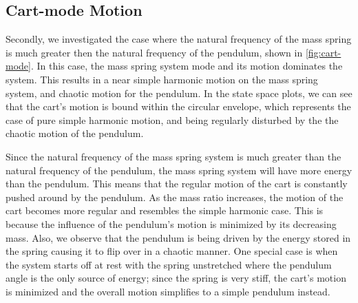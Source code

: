 \documentclass[12pt]{article}
\begin{document}
\subsection{Cart-mode Motion}

Secondly, we investigated the case where the natural frequency of the mass spring is much greater then the natural frequency of the pendulum, shown in \autoref{fig:cart-mode}. In this case, the mass spring system mode and its motion dominates the system. This results in a near simple harmonic motion on the mass spring system, and chaotic motion for the pendulum. In the state space plots, we can see that the cart's motion is bound within the circular envelope, which represents the case of pure simple harmonic motion, and being regularly disturbed by the the chaotic motion of the pendulum. 

Since the natural frequency of the mass spring system is much greater than the natural frequency of the pendulum, the mass spring system will have more energy than the pendulum. This means that the regular motion of the cart is constantly pushed around by the pendulum. As the mass ratio increases, the motion of the cart becomes more regular and resembles the simple harmonic case. This is because the influence of the pendulum's motion is minimized by its decreasing mass. Also, we observe that the pendulum is being driven by the energy stored in the spring causing it to flip over in a chaotic manner. One special case is when the system starts off at rest with the spring unstretched where the pendulum angle is the only source of energy; since the spring is very stiff, the cart's motion is minimized and the overall motion simplifies to a simple pendulum instead.
\end{document}
